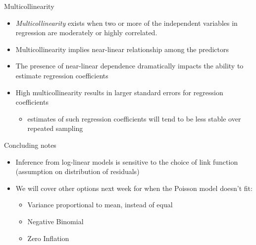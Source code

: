 \documentclass[ignorenonframetext,]{beamer}
\providecommand{\tightlist}{%
  \setlength{\itemsep}{0pt}\setlength{\parskip}{0pt}}
\begin{document}
\begin{frame}{Multicollinearity}

\begin{itemize}
\tightlist
\item
  \emph{Multicollinearity} exists when two or more of the independent
  variables in regression are moderately or highly correlated.
\item
  Multicollinearity implies near-linear relationship among the
  predictors
\item
  The presence of near-linear dependence dramatically impacts the
  ability to estimate regression coefficients
\item
  High multicollinearity results in larger standard errors for
  regression coefficients

  \begin{itemize}
  \tightlist
  \item
    estimates of such regression coefficients will tend to be less
    stable over repeated sampling
  \end{itemize}
\end{itemize}

\end{frame}

\begin{frame}{Concluding notes}

\begin{itemize}
\tightlist
\item
  Inference from log-linear models is sensitive to the choice of link
  function (assumption on distribution of residuals)
\item
  We will cover other options next week for when the Poisson model
  doesn't fit:

  \begin{itemize}
  \tightlist
  \item
    Variance proportional to mean, instead of equal
  \item
    Negative Binomial
  \item
    Zero Inflation
  \end{itemize}
\end{itemize}

\end{frame}
\end{document}
